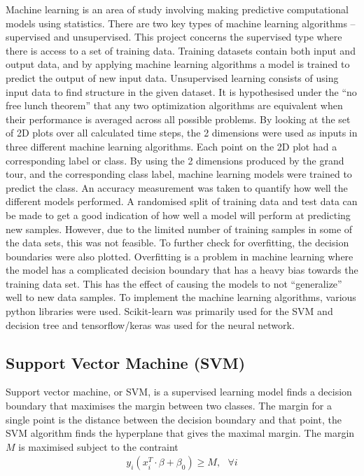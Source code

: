 \documentclass[a4paper,11pt,twoside]{article}
\begin{document}
Machine learning is an area of study involving making predictive computational models using statistics. There are two key types of machine learning algorithms – supervised and unsupervised. This project concerns the supervised type where there is access to a set of training data. Training datasets contain both input and output data, and by applying machine learning algorithms a model is trained to predict the output of new input data. Unsupervised learning consists of using input data to find structure in the given dataset.
\newline
\newline
It is hypothesised under the “no free lunch theorem” that any two optimization algorithms are equivalent when their performance is averaged across all possible problems. By looking at the set of 2D plots over all calculated time steps, the 2 dimensions were used as inputs in three different machine learning algorithms. Each point on the 2D plot had a corresponding label or class. By using the 2 dimensions produced by the grand tour, and the corresponding class label, machine learning models were trained to predict the class. An accuracy measurement was taken to quantify how well the different models performed. A randomised split of training data and test data can be made to get a good indication of how well a model will perform at predicting new samples. However, due to the limited number of training samples in some of the data sets, this was not feasible. To further check for overfitting, the decision boundaries were also plotted.
\newline
\newline
Overfitting is a problem in machine learning where the model has a complicated decision boundary that has a heavy bias towards the training data set. This has the effect of causing the models to not “generalize” well to new data samples.
\newline
\newline
To implement the machine learning algorithms, various python libraries were used. Scikit-learn was primarily used for the SVM and decision tree and tensorflow/keras was used for the neural network.

\subsection{Support Vector Machine (SVM)}

Support vector machine, or SVM, is a supervised learning model finds a decision boundary that maximises the margin between two classes. The margin for a single point is the distance between the decision boundary and that point, the SVM algorithm finds the hyperplane that gives the maximal margin. The margin $M$ is maximised subject to the contraint
\begin{equation}
\begin{gathered}
y_i(x_i^T\cdot\beta+\beta_0)\geq M,\text{ } \forall i
\end{gathered}
\end{equation}
\end{document}
